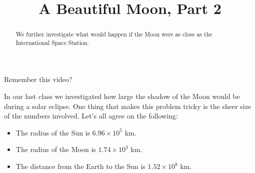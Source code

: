 \documentclass{ximera}
\title{A Beautiful Moon, Part 2}
\begin{document}
\begin{abstract}
We further investigate what would happen if the Moon were as close as the
International Space Station.
\end{abstract}
\maketitle
Remember this video?








In our last class we investigated how large the shadow of the Moon
would be during a solar eclipse. One thing that makes this problem
tricky is the sheer size of the numbers involved. Let's all agree on the following:
\begin{itemize}
\item The radius of the Sun is $6.96\times 10^5$ km.
\item The radius of the Moon is $1.74\times 10^3$ km.
\item The distance from the Earth to the Sun is $1.52\times 10^8$
  km.
\end{itemize}
\end{document}
